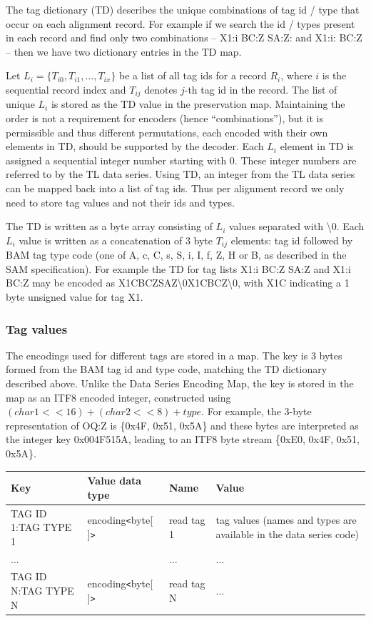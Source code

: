 \documentclass[a4paper]{article}
\begin{document}
The tag dictionary (TD) describes the unique combinations of tag id / type that occur on each alignment record.
For example if we search the id / types present in each record and find only two combinations -- X1:i BC:Z SA:Z: and X1:i: BC:Z -- then we have two dictionary entries in the TD map.

Let $L_{i}=\{T_{i0}, T_{i1}, \ldots, T_{ix}\}$ be a list of all tag ids for a record $R_{i}$, where $i$ is the sequential record index and $T_{ij}$ denotes $j$-th tag id in the record.
The list of unique $L_{i}$ is stored as the TD value in the preservation map.
Maintaining the order is not a requirement for encoders (hence ``combinations''), but it is permissible and thus different permutations, each encoded with their own elements in TD, should be supported by the decoder.
Each $L_{i}$ element in TD is assigned a sequential integer number starting with 0.
These integer numbers are referred to by the TL data series.
Using TD, an integer from the TL data series can be mapped back into a list of tag ids.
Thus per alignment record we only need to store tag values and not their ids and types.

The TD is written as a byte array consisting of $L_{i}$ values separated with \textbackslash{}0.
Each $L_{i}$ value is written as a concatenation of 3 byte $T_{ij}$ elements: tag id followed by BAM tag type code (one of A, c, C, s, S, i, I, f, Z, H or B, as described in the SAM specification).
For example the TD for tag lists X1:i BC:Z SA:Z and X1:i BC:Z may be encoded as X1CBCZSAZ\textbackslash{}0X1CBCZ\textbackslash{}0, with X1C indicating a 1 byte unsigned value for tag X1.

\subsubsection*{Tag values}

The encodings used for different tags are stored in a map.
The key is 3 bytes formed from the BAM tag id and type code, matching the TD dictionary described above.
Unlike the Data Series Encoding Map, the key is stored in the map as an ITF8 encoded integer, constructed using $(char1<<16) + (char2<<8) + type$.
For example, the 3-byte representation of OQ:Z is \{0x4F, 0x51, 0x5A\} and these bytes are interpreted as the integer key 0x004F515A, leading to an ITF8 byte stream \{0xE0, 0x4F, 0x51, 0x5A\}.

\begin{tabular}{|l|l|l|>{\raggedright}p{160pt}|}
\hline
\textbf{Key} & \textbf{Value data type} & \textbf{Name} & \textbf{Value}
\tabularnewline
\hline
TAG ID 1:TAG TYPE 1 & encoding\texttt{<}byte[ ]\texttt{>} & read tag 1 & tag values
(names and types are available in the data series code)\tabularnewline
\hline
... &  & ... & ...\tabularnewline
\hline
TAG ID N:TAG TYPE N & encoding\texttt{<}byte[ ]\texttt{>} & read tag N & ...\tabularnewline
\hline
\end{tabular}
\end{document}
